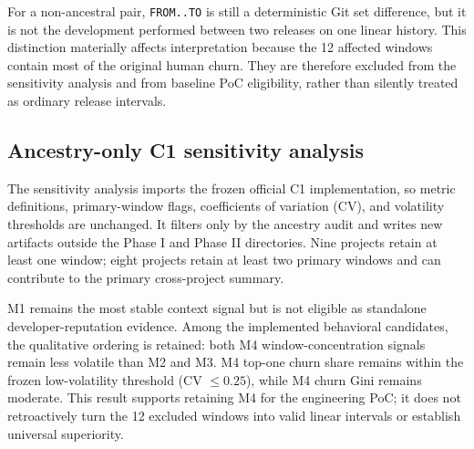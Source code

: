 For a non-ancestral pair, \texttt{FROM..TO} is still a deterministic Git set difference, but it is not the development
performed between two releases on one linear history. This distinction materially affects interpretation because the
12 affected windows contain most of the original human churn. They are therefore excluded from the sensitivity analysis
and from baseline PoC eligibility, rather than silently treated as ordinary release intervals.

\subsection{Ancestry-only C1 sensitivity analysis}
\label{sec:ancestry_c1_sensitivity}

The sensitivity analysis imports the frozen official C1 implementation, so metric definitions, primary-window flags,
coefficients of variation (CV), and volatility thresholds are unchanged. It filters only by the ancestry audit and writes
new artifacts outside the Phase I and Phase II directories. Nine projects retain at least one window; eight projects retain
at least two primary windows and can contribute to the primary cross-project summary.

\begin{table}[H]
\centering
\scriptsize
\renewcommand{\arraystretch}{1.08}
\caption{Original and ancestry-only C1 window-stability results. High-volatility counts use only projects with at least two primary windows.}
\label{tab:ancestry_c1_comparison}
\end{table}

M1 remains the most stable context signal but is not eligible as standalone developer-reputation evidence. Among the
implemented behavioral candidates, the qualitative ordering is retained: both M4 window-concentration signals remain less
volatile than M2 and M3. M4 top-one churn share remains within the frozen low-volatility threshold (CV $\leq 0.25$), while
M4 churn Gini remains moderate. This result supports retaining M4 for the engineering PoC; it does not retroactively turn
the 12 excluded windows into valid linear intervals or establish universal superiority.

